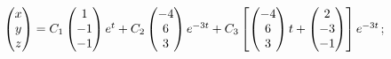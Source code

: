 \begin{enumsolsfull}
		\item \( \begin{pmatrix} x \\ y \\ z \end{pmatrix} = C_1 \begin{pmatrix} 1 \\ -1 \\ -1 \end{pmatrix} e^{t} + C_2 \begin{pmatrix} -4 \\ 6 \\ 3 \end{pmatrix} e^{-3t} + C_3 \left[ \begin{pmatrix} -4 \\ 6 \\ 3 \end{pmatrix} t + \begin{pmatrix} 2 \\ -3 \\ -1 \end{pmatrix} \right] e^{-3t} \); %

\end{enumsolsfull}
